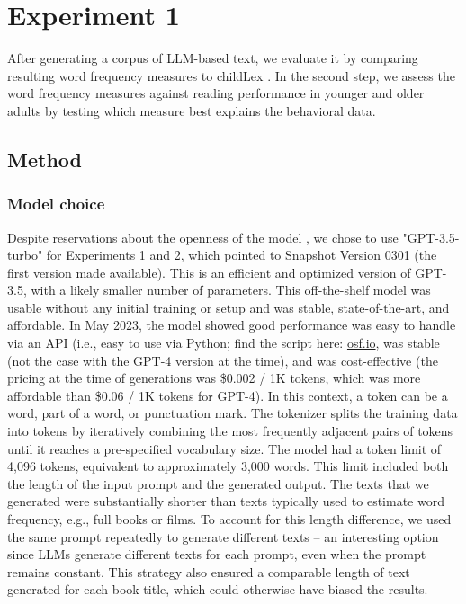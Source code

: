 \documentclass[manuscript]{stjour}
\begin{document}
\section{Experiment 1}

After generating a corpus of LLM-based text, we evaluate it by comparing resulting word frequency measures to childLex \citep{schroeder_childlex_2015}. In the second step, we assess the word frequency measures against reading performance \citep{schroter_developmental_2017} in younger and older adults by testing which measure best explains the behavioral data. 

\subsection{Method}

\subsubsection*{Model choice}

Despite reservations about the openness of the model \citep[see, e.g., ][]{liesenfeld_opening_2023, hussain_tutorial_2024}, we chose to use "GPT-3.5-turbo" for Experiments 1 and 2, which pointed to Snapshot Version 0301 (the first version made available). This is an efficient and optimized version of GPT-3.5, with a likely smaller number of parameters. This off-the-shelf model was usable without any initial training or setup and was stable, state-of-the-art, and affordable. In May 2023, the model showed good performance was easy to handle via an API (i.e., easy to use via Python; find the script here: \href{dx.doi.org/10.17605/OSF.IO/WMUVJ}{osf.io}, was stable (not the case with the GPT-4 version at the time), and was cost-effective (the pricing at the time of generations was \$0.002 / 1K tokens, which was more affordable than \$0.06 / 1K tokens for GPT-4). In this context, a token can be a word, part of a word, or punctuation mark. The tokenizer splits the training data into tokens by iteratively combining the most frequently adjacent pairs of tokens until it reaches a pre-specified vocabulary size. The model had a token limit of 4,096 tokens, equivalent to approximately 3,000 words. This limit included both the length of the input prompt and the generated output. The texts that we generated were substantially shorter than texts typically used to estimate word frequency, e.g., full books or films. To account for this length difference, we used the same prompt repeatedly to generate different texts – an interesting option since LLMs generate different texts for each prompt, even when the prompt remains constant. This strategy also ensured a comparable length of text generated for each book title, which could otherwise have biased the results. 
\end{document}
